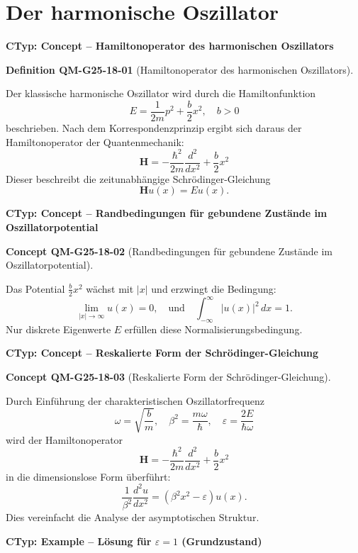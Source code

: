 \documentclass[10pt, letterpaper]{article}
\newcommand{\CustomHeading}[3]{%
  \par\medskip\noindent%
  \textbf{#1 #2} \textnormal{(#3)}.\enskip%
}
\newenvironment{DEF}[2]{\begin{unitbox}\CustomHeading{Definition}{#1}{#2}}{\end{unitbox}}
\newenvironment{CONC}[2]{\begin{unitbox}\CustomHeading{Concept}{#1}{#2}}{\end{unitbox}}
\begin{document}
\pagebreak




\section{Der harmonische Oszillator}


\textbf{CTyp: Concept – Hamiltonoperator des harmonischen Oszillators}

\begin{DEF}{QM-G25-18-01}{Hamiltonoperator des harmonischen Oszillators}
Der klassische harmonische Oszillator wird durch die Hamiltonfunktion
\[
E=\frac{1}{2m}p^2 + \frac{b}{2}x^2, \quad b > 0
\]
beschrieben. Nach dem Korrespondenzprinzip ergibt sich daraus der Hamiltonoperator der Quantenmechanik:
\[
\mathbf{H} = -\frac{\hbar^2}{2m}\frac{d^2}{dx^2} + \frac{b}{2}x^2
\]
Dieser beschreibt die zeitunabhängige Schrödinger-Gleichung
\[
\mathbf{H} u(x) = E u(x).
\]
\end{DEF}



\textbf{CTyp: Concept – Randbedingungen für gebundene Zustände im Oszillatorpotential}

\begin{CONC}{QM-G25-18-02}{Randbedingungen für gebundene Zustände im Oszillatorpotential}
Das Potential $\frac{b}{2}x^2$ wächst mit $|x|$ und erzwingt die Bedingung:
\[
\lim_{|x|\to\infty} u(x) = 0, \quad \text{und} \quad \int_{-\infty}^{\infty} |u(x)|^2 \, dx = 1.
\]
Nur diskrete Eigenwerte $E$ erfüllen diese Normalisierungsbedingung.
\end{CONC}



\textbf{CTyp: Concept – Reskalierte Form der Schrödinger-Gleichung}



\begin{CONC}{QM-G25-18-03}{Reskalierte Form der Schrödinger-Gleichung}
Durch Einführung der charakteristischen Oszillatorfrequenz
\[
\omega = \sqrt{\frac{b}{m}}, \quad \beta^2 = \frac{m\omega}{\hbar}, \quad \varepsilon = \frac{2E}{\hbar\omega}
\]
wird der Hamiltonoperator
\[
\mathbf{H} = -\frac{\hbar^2}{2m} \frac{d^2}{dx^2} + \frac{b}{2} x^2
\]
in die dimensionslose Form überführt:
\[
\frac{1}{\beta^2} \frac{d^2 u}{dx^2} = \left( \beta^2 x^2 - \varepsilon \right) u(x).
\]
Dies vereinfacht die Analyse der asymptotischen Struktur.
\end{CONC}


\textbf{CTyp: Example – Lösung für $\varepsilon = 1$ (Grundzustand)}
\end{document}
